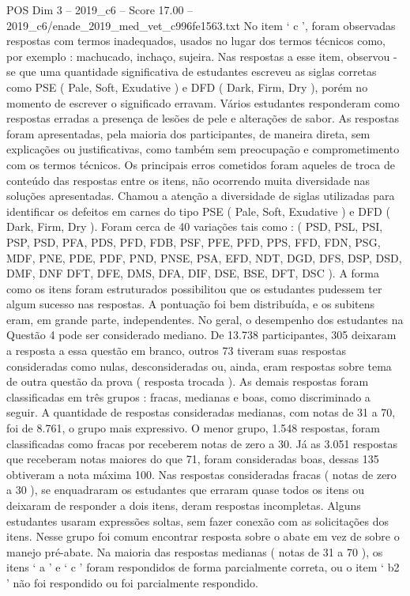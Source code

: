 \begin{textsample}{POS Dim 3 – 2019\_c6 – Score 17.00 – 2019\_c6/enade\_2019\_med\_vet\_c996fe1563.txt}
No item ‘ c ’, foram observadas respostas com termos inadequados, usados no lugar dos termos técnicos como, por exemplo : machucado, inchaço, sujeira.
Nas respostas a esse item, observou -se que uma quantidade significativa de estudantes escreveu as siglas corretas como PSE ( Pale, Soft, Exudative ) e DFD ( Dark, Firm, Dry ), porém no momento de escrever o significado erravam.
Vários estudantes responderam como respostas erradas a presença de lesões de pele e alterações de sabor.
As respostas foram apresentadas, pela maioria dos participantes, de maneira direta, sem explicações ou justificativas, como também sem preocupação e comprometimento com os termos técnicos.
Os principais erros cometidos foram aqueles de troca de conteúdo das respostas entre os itens, não ocorrendo muita diversidade nas soluções apresentadas.
Chamou a atenção a diversidade de siglas utilizadas para identificar os defeitos em carnes do tipo PSE ( Pale, Soft, Exudative ) e DFD ( Dark, Firm, Dry ).
Foram cerca de 40 variações tais como : ( PSD, PSL, PSI, PSP, PSD, PFA, PDS, PFD, FDB, PSF, PFE, PFD, PPS, FFD, FDN, PSG, MDF, PNE, PDE, PDF, PND, PNSE, PSA, EFD, NDT, DGD, DFS, DSP, DSD, DMF, DNF DFT, DFE, DMS, DFA, DIF, DSE, BSE, DFT, DSC ).
A forma como os itens foram estruturados possibilitou que os estudantes pudessem ter algum sucesso nas respostas.
A pontuação foi bem distribuída, e os subitens eram, em grande parte, independentes.
No geral, o desempenho dos estudantes na Questão 4 pode ser considerado mediano.
De 13.738 participantes, 305 deixaram a resposta a essa questão em branco, outros 73 tiveram suas respostas consideradas como nulas, desconsideradas ou, ainda, eram respostas sobre tema de outra questão da prova ( resposta trocada ).
As demais respostas foram classificadas em três grupos : fracas, medianas e boas, como discriminado a seguir.
A quantidade de respostas consideradas medianas, com notas de 31 a 70, foi de 8.761, o grupo mais expressivo.
O menor grupo, 1.548 respostas, foram classificadas como fracas por receberem notas de zero a 30.
Já as 3.051 respostas que receberam notas maiores do que 71, foram consideradas boas, dessas 135 obtiveram a nota máxima 100.
Nas respostas consideradas fracas ( notas de zero a 30 ), se enquadraram os estudantes que erraram quase todos os itens ou deixaram de responder a dois itens, deram respostas incompletas.
Alguns estudantes usaram expressões soltas, sem fazer conexão com as solicitações dos itens.
Nesse grupo foi comum encontrar resposta sobre o abate em vez de sobre o manejo pré-abate.
Na maioria das respostas medianas ( notas de 31 a 70 ), os itens ‘ a ’ e ‘ c ’ foram respondidos de forma parcialmente correta, ou o item ‘ b2 ’ não foi respondido ou foi parcialmente respondido.

\end{textsample}
